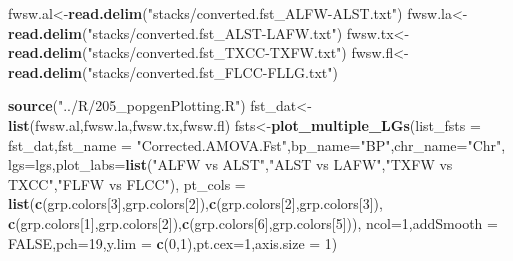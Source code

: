 \documentclass[]{article}
\newenvironment{Shaded}{\begin{snugshade}}{\end{snugshade}}
\newcommand{\KeywordTok}[1]{\textcolor[rgb]{0.13,0.29,0.53}{\textbf{#1}}}
\newcommand{\DataTypeTok}[1]{\textcolor[rgb]{0.13,0.29,0.53}{#1}}
\newcommand{\DecValTok}[1]{\textcolor[rgb]{0.00,0.00,0.81}{#1}}
\newcommand{\StringTok}[1]{\textcolor[rgb]{0.31,0.60,0.02}{#1}}
\newcommand{\OtherTok}[1]{\textcolor[rgb]{0.56,0.35,0.01}{#1}}
\newcommand{\NormalTok}[1]{#1}
\begin{document}
\begin{Shaded}
\begin{Highlighting}[]
\NormalTok{fwsw.al<-}\KeywordTok{read.delim}\NormalTok{(}\StringTok{"stacks/converted.fst_ALFW-ALST.txt"}\NormalTok{)}
\NormalTok{fwsw.la<-}\KeywordTok{read.delim}\NormalTok{(}\StringTok{"stacks/converted.fst_ALST-LAFW.txt"}\NormalTok{)}
\NormalTok{fwsw.tx<-}\KeywordTok{read.delim}\NormalTok{(}\StringTok{"stacks/converted.fst_TXCC-TXFW.txt"}\NormalTok{)}
\NormalTok{fwsw.fl<-}\KeywordTok{read.delim}\NormalTok{(}\StringTok{"stacks/converted.fst_FLCC-FLLG.txt"}\NormalTok{)}
\end{Highlighting}
\end{Shaded}

\begin{Shaded}
\begin{Highlighting}[]
\KeywordTok{source}\NormalTok{(}\StringTok{"../R/205_popgenPlotting.R"}\NormalTok{)}
\NormalTok{fst_dat<-}\KeywordTok{list}\NormalTok{(fwsw.al,fwsw.la,fwsw.tx,fwsw.fl)}
\NormalTok{fsts<-}\KeywordTok{plot_multiple_LGs}\NormalTok{(}\DataTypeTok{list_fsts =}\NormalTok{ fst_dat,}\DataTypeTok{fst_name =} \StringTok{"Corrected.AMOVA.Fst"}\NormalTok{,}\DataTypeTok{bp_name=}\StringTok{"BP"}\NormalTok{,}\DataTypeTok{chr_name=}\StringTok{"Chr"}\NormalTok{,}
                        \DataTypeTok{lgs=}\NormalTok{lgs,}\DataTypeTok{plot_labs=}\KeywordTok{list}\NormalTok{(}\StringTok{"ALFW vs ALST"}\NormalTok{,}\StringTok{"ALST vs LAFW"}\NormalTok{,}\StringTok{"TXFW vs TXCC"}\NormalTok{,}\StringTok{"FLFW vs FLCC"}\NormalTok{),}
                        \DataTypeTok{pt_cols =} \KeywordTok{list}\NormalTok{(}\KeywordTok{c}\NormalTok{(grp.colors[}\DecValTok{3}\NormalTok{],grp.colors[}\DecValTok{2}\NormalTok{]),}\KeywordTok{c}\NormalTok{(grp.colors[}\DecValTok{2}\NormalTok{],grp.colors[}\DecValTok{3}\NormalTok{]),}
                                       \KeywordTok{c}\NormalTok{(grp.colors[}\DecValTok{1}\NormalTok{],grp.colors[}\DecValTok{2}\NormalTok{]),}\KeywordTok{c}\NormalTok{(grp.colors[}\DecValTok{6}\NormalTok{],grp.colors[}\DecValTok{5}\NormalTok{])),}
                        \DataTypeTok{ncol=}\DecValTok{1}\NormalTok{,}\DataTypeTok{addSmooth =} \OtherTok{FALSE}\NormalTok{,}\DataTypeTok{pch=}\DecValTok{19}\NormalTok{,}\DataTypeTok{y.lim =} \KeywordTok{c}\NormalTok{(}\DecValTok{0}\NormalTok{,}\DecValTok{1}\NormalTok{),}\DataTypeTok{pt.cex=}\DecValTok{1}\NormalTok{,}\DataTypeTok{axis.size =} \DecValTok{1}\NormalTok{)}
\end{Highlighting}
\end{Shaded}
\end{document}
